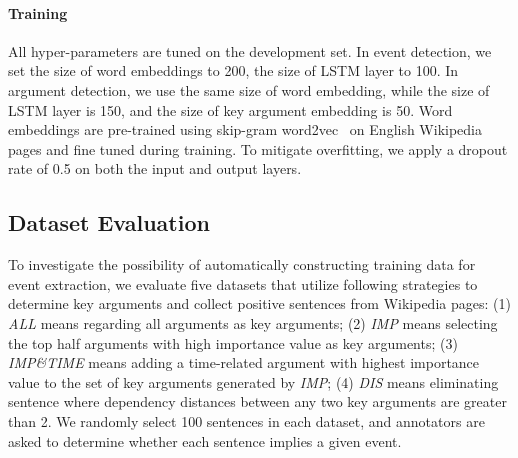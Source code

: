 \paragraph{Training} All hyper-parameters are tuned on the development set. In event detection, we set the size of word embeddings to 200, the size of LSTM layer to 100. In argument detection, we use the same size of word embedding, while the size of LSTM layer is 150, and the size of key argument embedding is 50. Word embeddings are pre-trained using skip-gram word2vec~\cite{mikolov2013distributed} on English Wikipedia pages and fine tuned during training. To mitigate overfitting, we apply a dropout rate of 0.5 on both the input and output layers.

\subsection{Dataset Evaluation}\label{sec:evalhypo}
To investigate the possibility of automatically constructing training data for event extraction, we evaluate five datasets that utilize  following strategies to determine key arguments and collect positive sentences from Wikipedia pages: (1) \emph{ALL} means regarding all arguments as key arguments; (2) \emph{IMP} means selecting the top half arguments with high importance value as key arguments; (3) \emph{IMP\&TIME} means adding a time-related argument with highest importance value to the set of key arguments generated by \emph{IMP}; (4) \emph{DIS} means eliminating sentence where dependency distances between any two key arguments are greater than 2. We randomly select 100 sentences in each dataset, and annotators are asked to determine whether each sentence implies a given event.

